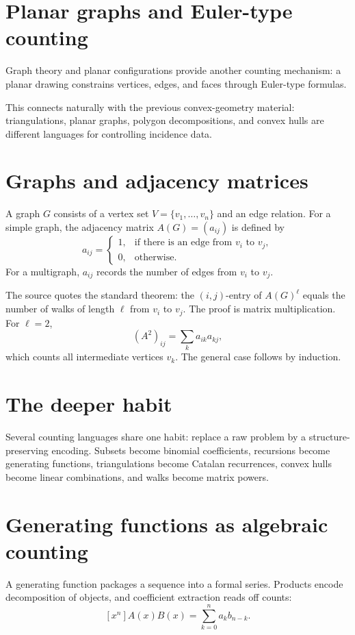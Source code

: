 \section{Planar graphs and Euler-type counting}

Graph theory and planar configurations provide another counting mechanism: a planar drawing constrains vertices, edges, and faces through Euler-type formulas.

This connects naturally with the previous convex-geometry material: triangulations, planar graphs, polygon decompositions, and convex hulls are different languages for controlling incidence data.

\section{Graphs and adjacency matrices}

A graph $G$ consists of a vertex set $V=\{v_1,\ldots,v_n\}$ and an edge relation.  For a simple graph, the adjacency matrix $A(G)=(a_{ij})$ is defined by
\[
  a_{ij}=
  \begin{cases}
  1,&\text{if there is an edge from }v_i\text{ to }v_j,\\
  0,&\text{otherwise.}
  \end{cases}
\]
For a multigraph, $a_{ij}$ records the number of edges from $v_i$ to $v_j$.

The source quotes the standard theorem: the $(i,j)$-entry of $A(G)^\ell$ equals the number of walks of length $\ell$ from $v_i$ to $v_j$.  The proof is matrix multiplication.  For $\ell=2$,
\[
  (A^2)_{ij}=\sum_k a_{ik}a_{kj},
\]
which counts all intermediate vertices $v_k$.  The general case follows by induction.

\enlargethispage{4\baselineskip}
\section{The deeper habit}

Several counting languages share one habit: replace a raw problem by a structure-preserving encoding.  Subsets become binomial coefficients, recursions become generating functions, triangulations become Catalan recurrences, convex hulls become linear combinations, and walks become matrix powers.

\section{Generating functions as algebraic counting}
A generating function packages a sequence into a formal series.  Products encode decomposition of objects, and coefficient extraction reads off counts:
\[
[x^n]A(x)B(x)=\sum_{k=0}^n a_kb_{n-k}.
\]
